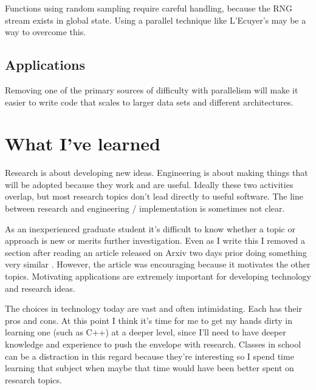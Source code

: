 \documentclass[12pt]{article}
\begin{document}
Functions using random sampling require careful handling, because the RNG
stream exists in global state. Using a parallel technique like L'Ecuyer's
may be a way to overcome this.

\subsection{Applications}

Removing one of the primary sources of difficulty with parallelism will
make it easier to write code that scales to larger data sets and different
architectures.

\section{What I've learned}

Research is about developing new ideas. Engineering is about making
things that will be adopted because they work and are useful. Ideally these
two activities overlap, but most research topics don't lead directly to useful
software. The line between research and engineering / implementation is
sometimes not clear.

As an inexperienced graduate student it's difficult to know whether a topic
or approach is new or merits further investigation. Even as I write this I
removed a section after reading an article released on Arxiv two days prior
doing something very similar \cite{compare_bigdata}. However, the article
was encouraging because it motivates the other topics.
Motivating applications are extremely important for developing technology
and research ideas.

The choices in technology today are vast and often intimidating. Each has
their pros and cons. At this point I think it's time for me to get my hands
dirty in learning one (such as C++) at a deeper level, since I'll need to
have deeper knowledge and experience to push the envelope with research.
Classes in school can be a distraction in this regard because they're interesting
so I spend time learning that subject when maybe that time would have been
better spent on research topics.

\newpage

 
\end{document}

